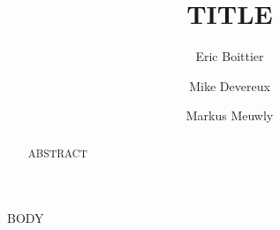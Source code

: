 \documentclass[journal=jacsat,manuscript=article]{achemso}
\author{Eric Boittier}
\author{Mike Devereux}
\author{Markus Meuwly}
\affiliation[University of Basel]
{Department of Chemistry, University of Basel, Switzerland}
\title[ {{SHORTTITLE }} ] { {{TITLE}} }
\begin{document}
\begin{abstract}
{{ABSTRACT}}
\end{abstract}

{{ BODY }}
\end{document}

